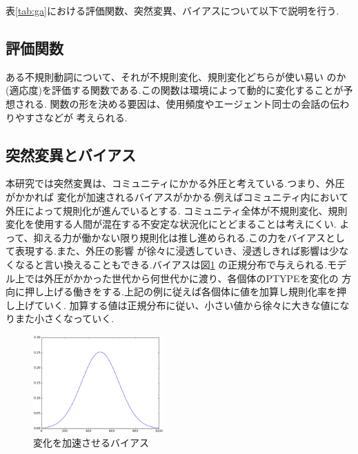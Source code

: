 \documentclass[10.5pt, a4j, twocolumn]{jsarticle}
\begin{document}
表\ref{tab:ga}における評価関数、突然変異、バイアスについて以下で説明を行う.
\subsection{評価関数}\label{sec:evalfunc}
ある不規則動詞について、それが不規則変化、規則変化どちらが使い易い
のか(適応度)を評価する関数である.この関数は環境によって動的に変化することが予想される.
関数の形を決める要因は、使用頻度やエージェント同士の会話の伝わりやすさなどが
考えられる.
\subsection{突然変異とバイアス}\label{sec:mutatebias}
本研究では突然変異は、コミュニティにかかる外圧と考えている.つまり、外圧がかかれば
変化が加速されるバイアスがかかる.例えばコミュニティ内において外圧によって規則化が進んでいるとする.
コミュニティ全体が不規則変化、規則変化を使用する人間が混在する不安定な状況化にとどまることは考えにくい.
よって、抑える力が働かない限り規則化は推し進められる.この力をバイアスとして表現する.また、外圧の影響
が徐々に浸透していき、浸透しきれば影響は少なくなると言い換えることもできる.バイアスは図\ref{fig:bias}
の正規分布で与えられる.モデル上では外圧がかかった世代から何世代かに渡り、各個体のPTYPEを変化の
方向に押し上げる働きをする.上記の例に従えば各個体に値を加算し規則化率を押し上げていく.
加算する値は正規分布に従い、小さい値から徐々に大きな値になりまた小さくなっていく.

\begin{figure}[htbp]
 \centering
 \includegraphics[width=5cm]{bias.eps}
 \caption{変化を加速させるバイアス\label{fig:bias}}
\end{figure}
\end{document}

